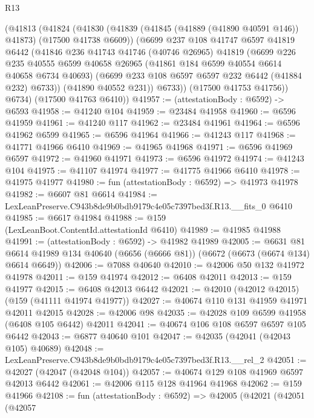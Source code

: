 \begin{lexlean}{R13}
\begin{coremodule}
      (@41813
        (@41824
          (@41830
            (@41839 (@41845 (@41889 (@41890 @40591 @146)) @41873) (@17500 @41738 @6609))
            (@6699
              @237
              @108
              @41747
              @6597
              @41819
              @6442
              (@41846
                @236
                @41743
                @41746
                (@40746 @26965)
                @41819
                (@6699
                  @226
                  @235
                  @40555
                  @6599
                  @40658
                  @26965
                  (@41861 @184 @6599 @40554 @6614 @40658 @6734 @40693)
                  (@6699 @233 @108 @6597 @6597 @232 @6442 (@41884 @232) @6733))
                (@41890 @40552 @231))
              @6733))
          (@17500 @41753 @41756))
        @6734)
      (@17500 @41763 @6410))
@41957 := (attestationBody : @6592) -> @6593
@41958 := @41240 @104
@41959 := @23484 @41958
@41960 := @6596 @41959
@41961 := @41240 @117
@41962 := @23484 @41961
@41964 := @6596 @41962 @6599
@41965 := @6596 @41964
@41966 := @41243 @117
@41968 := @41771 @41966 @6410
@41969 := @41965 @41968
@41971 := @6596 @41969 @6597
@41972 := @41960 @41971
@41973 := @6596 @41972
@41974 := @41243 @104
@41975 := @41107 @41974
@41977 := @41775 @41966 @6410
@41978 := @41975 @41977
@41980 := fun (attestationBody : @6592) => @41973 @41978
@41982 := @6607 @81 @6614
@41984 := LexLeanPreserve.C943b8de9b0bdb9179c4e05c7397bed3f.R13.__fits_0 @6410
@41985 := @6617 @41984
@41988 := @159 (LexLeanBoot.ContentId.attestationId @6410)
@41989 := @41985 @41988
@41991 := (attestationBody : @6592) -> @41982 @41989
@42005 := @6631
    @81
    @6614
    @41989
    @134
    @40640
    (@6656 (@6666 @81))
    (@6672 (@6673 (@6674 @134) @6614 @6649))
@42006 := @7088 @40640
@42010 := @42006 @50 @132 @41972 @41978
@42011 := @159 @41974
@42012 := @6408 @42011
@42013 := @159 @41977
@42015 := @6408 @42013 @6442
@42021 := @42010 (@42012 @42015) (@159 (@41111 @41974 @41977))
@42027 := @40674 @110 @131 @41959 @41971 @42011 @42015
@42028 := @42006 @98
@42035 := @42028 @109 @6599 @41958 (@6408 @105 @6442) @42011
@42041 := @40674 @106 @108 @6597 @6597 @105 @6442
@42043 := @6877 @40640 @101
@42047 := @42035 (@42041 (@42043 @105) @40689)
@42048 := LexLeanPreserve.C943b8de9b0bdb9179c4e05c7397bed3f.R13.__rel_2
@42051 := @42027 (@42047 (@42048 @104))
@42057 := @40674 @129 @108 @41969 @6597 @42013 @6442
@42061 := @42006 @115 @128 @41964 @41968
@42062 := @159 @41966
@42108 := fun (attestationBody : @6592) =>
  @42005
    (@42021
      (@42051
        (@42057

\end{coremodule}
\end{lexlean}
